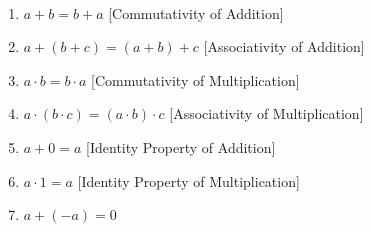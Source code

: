\documentclass[crop=false,class=article,oneside]{standalone}
\begin{document}
        \begin{properties}
            \label{property:North_Shore_Arithmetic_Properties}
            \
            \begin{enumerate}
                \item
                    \label{%
                        property:%
                        North_Shore_Arithmetic_Properties_%
                        Com_Add%
                    }
                    $a+b=b+a$\hfill
                    [Commutativity of Addition]
                \item
                    \label{
                        property:%
                        north_shore_arithmetic_properties_%
                        assoc_add%
                    }
                    $a+(b+c)=(a+b)+c$\hfill
                    [Associativity of Addition]
                \item
                    \label{%
                        property:%
                        north_shore_arithmetic_properties_%
                        comm_mult%
                    }
                    ${a}\cdot{b}={b}\cdot{a}$\hfill
                    [Commutativity of Multiplication]
                \item
                    \label{%
                        property:%
                        north_shore_arithmetic_properties_%
                        assoc_mult%
                    }
                    ${a}\cdot{({b}\cdot{c})}%
                     ={({a}\cdot{b})}\cdot{c}$\hfill
                    [Associativity of Multiplication]
                \item
                    \label{%
                        property:%
                        north_shore_arithmetic_properties_%
                        add_identity
                    }
                    $a+0=a$\hfill%
                    [Identity Property of Addition]
                \item
                    \label{%
                        property:%
                        north_shore_arithmetic_properties_%
                        mult_identity%
                    }
                    ${a}\cdot{1}=a$\hfill
                    [Identity Property of Multiplication]
                \item
                    \label{%
                        property:%
                        north_shore_arithmetic_properties_%
                        add_inverse%
                    }
                    $a+(-a)=0$\hfill

\end{enumerate}
\end{properties}
\end{document}
